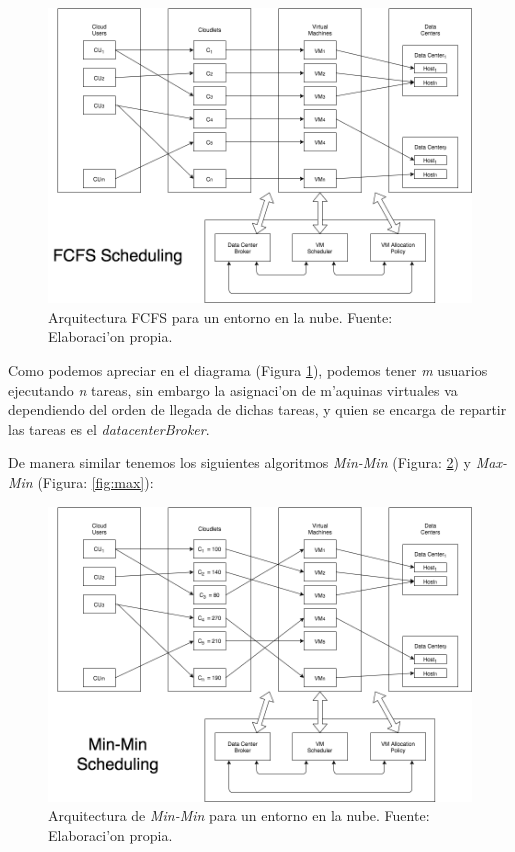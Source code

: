 \renewcommand\thefigure{\arabic{figure}}
\begin{figure}[h!]
	\centering
	\includegraphics[scale=0.4]{media/imagentres}
	\caption{Arquitectura FCFS para un entorno en la nube. Fuente: Elaboraci'on propia.}
	\label{fig:fcfs}
\end{figure}

Como podemos apreciar en el diagrama (Figura \ref{fig:fcfs}), podemos tener \emph{m} usuarios ejecutando \emph{n} tareas, sin embargo la asignaci'on de m'aquinas virtuales va dependiendo del orden de llegada de dichas tareas, y quien se encarga de repartir las tareas es el \textit{datacenterBroker}.
\newpage

De manera similar tenemos los siguientes algoritmos \textit{Min-Min} (Figura: \ref{fig:min}) y \textit{Max-Min} (Figura: \ref{fig:max}):

\renewcommand\thefigure{\arabic{figure}}
\begin{figure}[h!]
	\centering
	\includegraphics[scale=0.4]{media/imagencinco}
	\caption{Arquitectura de \textit{Min-Min} para un entorno en la nube. Fuente: Elaboraci'on propia.}
	\label{fig:min}
\end{figure}


